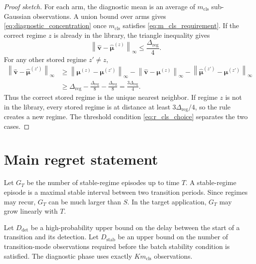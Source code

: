 \documentclass[11pt]{article}
\newcommand{\norm}[1]{\left\lVert #1 \right\rVert}
\begin{document}
\begin{proof}[Proof sketch]
For each arm, the diagnostic mean is an average of $m_{\mathrm{cls}}$ sub-Gaussian observations. A union bound over arms gives \eqref{eq:diagnostic_concentration} once $m_{\mathrm{cls}}$ satisfies \eqref{eq:m_cls_requirement}. If the correct regime $z$ is already in the library, the triangle inequality gives
\begin{equation}
\label{eq:correct_distance_bound}
\norm{\widehat{\bm v}-\widehat{\bm\mu}^{(z)}}_{\infty}
\leq
\frac{\Delta_{\mathrm{reg}}}{4}.
\end{equation}
For any other stored regime $z'\neq z$,
\begin{align}
\label{eq:wrong_distance_bound}
\norm{\widehat{\bm v}-\widehat{\bm\mu}^{(z')}}_{\infty}
&\geq
\norm{\bm\mu^{(z)}-\bm\mu^{(z')}}_{\infty}
-
\norm{\widehat{\bm v}-\bm\mu^{(z)}}_{\infty}
-
\norm{\widehat{\bm\mu}^{(z')}-\bm\mu^{(z')}}_{\infty}
\\
&\geq
\Delta_{\mathrm{reg}}-\frac{\Delta_{\mathrm{reg}}}{8}-
\frac{\Delta_{\mathrm{reg}}}{8}
=
\frac{3\Delta_{\mathrm{reg}}}{4}.
\end{align}
Thus the correct stored regime is the unique nearest neighbor. If regime $z$ is not in the library, every stored regime is at distance at least $3\Delta_{\mathrm{reg}}/4$, so the rule creates a new regime. The threshold condition \eqref{eq:r_cls_choice} separates the two cases.
\end{proof}

\section{Main regret statement}
\label{sec:main_regret}

Let $G_T$ be the number of stable-regime episodes up to time $T$. A stable-regime episode is a maximal stable interval between two transition periods. Since regimes may recur, $G_T$ can be much larger than $S$. In the target application, $G_T$ may grow linearly with $T$.

Let $D_{\mathrm{det}}$ be a high-probability upper bound on the delay between the start of a transition and its detection. Let $D_{\mathrm{stab}}$ be an upper bound on the number of transition-mode observations required before the batch stability condition is satisfied. The diagnostic phase uses exactly $K m_{\mathrm{cls}}$ observations.
\end{document}
